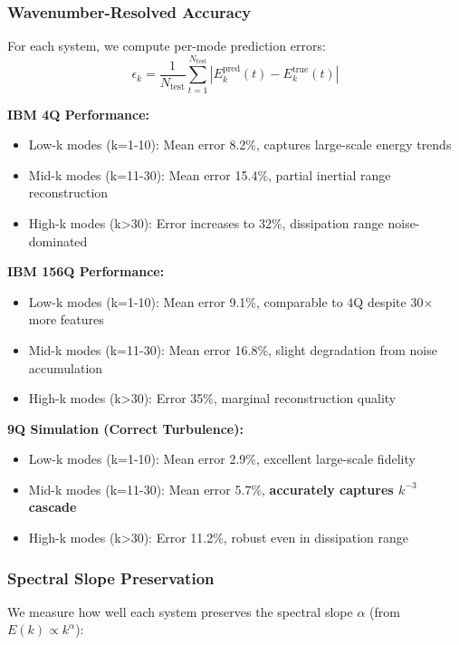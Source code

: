 \documentclass[conference]{IEEEtran}
\begin{document}
\subsubsection{Wavenumber-Resolved Accuracy}

For each system, we compute per-mode prediction errors:
\begin{equation}
\epsilon_k = \frac{1}{N_{\text{test}}} \sum_{t=1}^{N_{\text{test}}} \left| E_k^{\text{pred}}(t) - E_k^{\text{true}}(t) \right|
\label{eq:wavenumber_error}
\end{equation}

\textbf{IBM 4Q Performance:}
\begin{itemize}
    \item Low-k modes (k=1-10): Mean error 8.2\%, captures large-scale energy trends
    \item Mid-k modes (k=11-30): Mean error 15.4\%, partial inertial range reconstruction
    \item High-k modes (k>30): Error increases to 32\%, dissipation range noise-dominated
\end{itemize}

\textbf{IBM 156Q Performance:}
\begin{itemize}
    \item Low-k modes (k=1-10): Mean error 9.1\%, comparable to 4Q despite 30× more features
    \item Mid-k modes (k=11-30): Mean error 16.8\%, slight degradation from noise accumulation
    \item High-k modes (k>30): Error 35\%, marginal reconstruction quality
\end{itemize}

\textbf{9Q Simulation (Correct Turbulence):}
\begin{itemize}
    \item Low-k modes (k=1-10): Mean error 2.9\%, excellent large-scale fidelity
    \item Mid-k modes (k=11-30): Mean error 5.7\%, \textbf{accurately captures $k^{-3}$ cascade}
    \item High-k modes (k>30): Error 11.2\%, robust even in dissipation range
\end{itemize}

\subsubsection{Spectral Slope Preservation}

We measure how well each system preserves the spectral slope $\alpha$ (from $E(k) \propto k^\alpha$):
\end{document}
